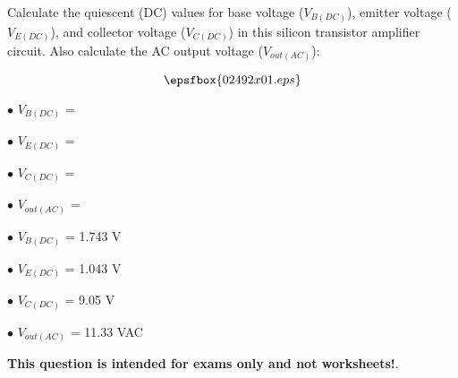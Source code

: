 

Calculate the quiescent (DC) values for base voltage ($V_{B(DC)}$), emitter voltage ($V_{E(DC)}$), and collector voltage ($V_{C(DC)}$) in this silicon transistor amplifier circuit.  Also calculate the AC output voltage ($V_{out(AC)}$):

$$\epsfbox{02492x01.eps}$$

\medskip
\item{$\bullet$} $V_{B(DC)}$ = 
\item{$\bullet$} $V_{E(DC)}$ = 
\item{$\bullet$} $V_{C(DC)}$ = 
\item{$\bullet$} $V_{out(AC)}$ = 
\medskip







\medskip
\goodbreak
\item{$\bullet$} $V_{B(DC)}$ = 1.743 V
\item{$\bullet$} $V_{E(DC)}$ = 1.043 V
\item{$\bullet$} $V_{C(DC)}$ = 9.05 V
\item{$\bullet$} $V_{out(AC)}$ = 11.33 VAC
\medskip







{\bf This question is intended for exams only and not worksheets!}.




